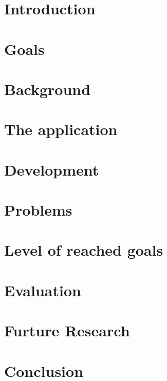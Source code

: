 \documentclass[a4paper,pt12]{article}
\begin{document}
\tableofcontents
\newpage

\section{Introduction}



\section{Goals}


\section{Background}


\section{The application}


\section{Development}


\section{Problems}


\section{Level of reached goals}


\section{Evaluation}


\section{Furture Research}


\section{Conclusion}



%
%
\end{document}
